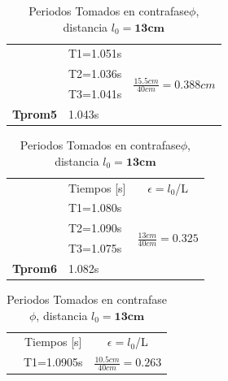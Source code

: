 \documentclass{article}
\begin{document}
\begin{table}[H]
\begin{subtable}{.5\linewidth}
\begin{tabular}{@{}l|l|l|@{}}
                      & T1=1.051s                        & \multirow{4}{*}{$\frac{15.5cm}{40cm}=0.388cm$} \\ \cmidrule(lr){2-2}
                      & T2=1.036s                        &                                \\ \cmidrule(lr){2-2}
                      & T3=1.041s                        &                                \\ \cmidrule(lr){2-2}
\textbf{Tprom5}   	  & 1.043s                           &                                \\ \cmidrule(l){2-3} 
\end{tabular}
\caption{Periodos Tomados en contrafase$\phi$, distancia $l_{0}=\textbf{15.5cm}$}
\label{contrafase1-5}
    \end{subtable}%
    \begin{subtable}{.8\linewidth}
      \centering
        \begin{tabular}{@{}l|l|l|@{}}
		\cmidrule(l){2-3}
\multicolumn{1}{c|}{} & \multicolumn{1}{c|}{Tiempos [s]} & \multicolumn{1}{c|}{$\epsilon=l_{0}$/L}       \\ \cmidrule(l){2-3} 
                      & T1=1.080s                        & \multirow{4}{*}{$\frac{13cm}{40cm}=0.325$}  \\ \cmidrule(lr){2-2}
                      & T2=1.090s                        &                                                 \\ \cmidrule(lr){2-2}
                      & T3=1.075s                        &                                  				 \\ \cmidrule(lr){2-2}
	\textbf{Tprom6}   & 1.082s                          &               				                      \\ \cmidrule(l){2-3} 
\end{tabular}
\caption{Periodos Tomados en contrafase$\phi$, distancia $l_{0}=\textbf{13cm}$}
\label{contrafase1-6}
 \end{subtable} 
       \centering
    \begin{subtable}{.8\linewidth}
      \centering
        \begin{tabular}{@{}l|l|l|@{}}
		\cmidrule(l){2-3}
\multicolumn{1}{c|}{} & \multicolumn{1}{c|}{Tiempos [s]} & \multicolumn{1}{c|}{$\epsilon=l_{0}$/L}       \\ \cmidrule(l){2-3} 
                      & T1=1.0905s                       & \multirow{4}{*}{$\frac{10.5cm}{40cm}=0.263$}  \\ \cmidrule(lr){2-2}

\end{tabular}
\end{subtable}
\end{table}
\end{document}
